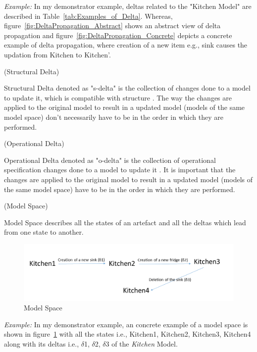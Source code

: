 \textit{Example:} In my demonstrator example, deltas related to the "Kitchen Model" are described in Table~\ref{tab:Examples_of_Delta}. Whereas, figure~\ref{fig:DeltaPropagation_Abstract} shows an abstract view of delta propagation and figure~\ref{fig:DeltaPropagation_Concrete} depicts a concrete example of delta propagation, where creation of a new item e.g., sink causes the updation from Kitchen to Kitchen'.\\

\begin{defn}\label{defStructuralDelta } (Structural Delta) \end{defn}
Structural Delta denoted as "s-delta" is the collection of changes done to a model to update it, which is compatible with structure \cite{benchmarx-reload}. The way the changes are applied to the original model to result in a updated model (models of the same model space) don't necessarily have to be in the order in which they are performed.\\

\begin{defn}\label{defOperationalDelta } (Operational Delta) \end{defn}
Operational Delta denoted as "o-delta" is the collection of operational specification changes done to a model to update it \cite{benchmarx-reload}. It is important that the changes are applied to the original model to result in a updated model (models of the same model space) have to be in the order in which they are performed.\\ 

\begin{defn}\label{defModelSpace } (Model Space) \end{defn}
Model Space describes all the states of an artefact and all the deltas which lead from one state to another.
\begin{figure}
	\includegraphics[width=1\textwidth]{figures/Model_Space}
	\caption{Model Space}
	\label{fig:Model_Space}
\end{figure}

\textit{Example:} In my demonstrator example, an concrete example of a model space is shown in figure~\ref{fig:Model_Space} with all the states i.e., Kitchen1, Kitchen2, Kitchen3, Kitchen4 along with its deltas i.e., $\delta$1, $\delta$2, $\delta$3 of the \textit{Kitchen} Model.\\

